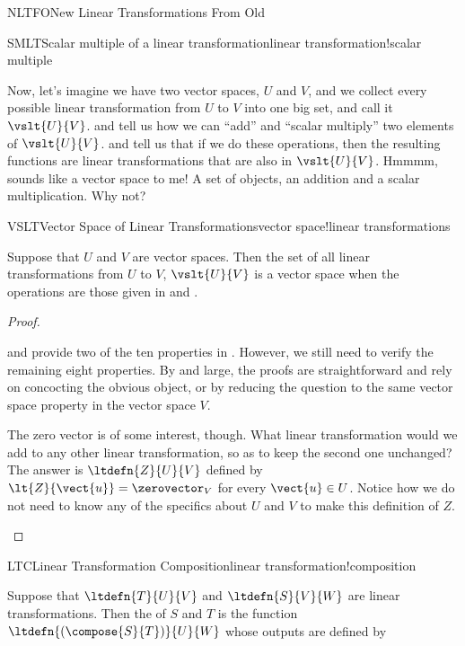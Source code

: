 \begin{subsect}{NLTFO}{New Linear Transformations From Old}
\begin{example}{SMLT}{Scalar multiple of a linear transformation}{linear transformation!scalar multiple}
%
\end{example}
%
\begin{para}Now, let's imagine we have two vector spaces, $U$ and $V$, and we collect every possible linear transformation from $U$ to $V$ into one big set, and call it $\vslt{U}{V}$.   and  tell us how we can ``add'' and ``scalar multiply'' two elements of $\vslt{U}{V}$.   and  tell us that if we do these operations, then the resulting functions are linear transformations that are also in $\vslt{U}{V}$.   Hmmmm, sounds like a vector space to me!  A set of objects, an addition and a scalar multiplication.  Why not?\end{para}
%
\begin{theorem}{VSLT}{Vector Space of Linear Transformations}{vector space!linear transformations}
\begin{para}Suppose that $U$ and $V$ are vector spaces.  Then the set of all linear transformations from $U$ to $V$, $\vslt{U}{V}$ is a vector space when the operations are those given in  and .\end{para}
\end{theorem}
%
\begin{proof}
\begin{para} and  provide two of the ten properties in .  However, we still need to verify the remaining eight properties.  By and large, the proofs are straightforward and rely on concocting the obvious object, or by reducing the question to the same vector space property in the vector space $V$.\end{para}
%
\begin{para}The zero vector is of some interest, though. What linear transformation would we add to any other linear transformation, so as to keep the second one unchanged?  The answer is $\ltdefn{Z}{U}{V}$ defined by $\lt{Z}{\vect{u}}=\zerovector_V$ for every $\vect{u}\in U$.  Notice how we do not need to know any of the specifics about $U$ and $V$ to make this definition of $Z$.\end{para}
%
\end{proof}
%
\begin{definition}{LTC}{Linear Transformation Composition}{linear transformation!composition}
\begin{para}Suppose that $\ltdefn{T}{U}{V}$ and $\ltdefn{S}{V}{W}$ are linear transformations.  Then the  of $S$ and $T$ is the function $\ltdefn{(\compose{S}{T})}{U}{W}$ whose outputs are defined by

\end{para}
\end{definition}
\end{subsect}
